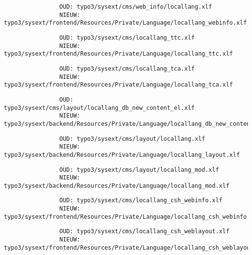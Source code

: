\begin{frame}[fragile]
\begin{itemize}
			\begin{lstlisting}
				OUD: typo3/sysext/cms/web_info/locallang.xlf
				NIEUW: typo3/sysext/frontend/Resources/Private/Language/locallang_webinfo.xlf
			\end{lstlisting}
			\vspace{-0.3cm}
			\begin{lstlisting}
				OUD: typo3/sysext/cms/locallang_ttc.xlf
				NIEUW: typo3/sysext/frontend/Resources/Private/Language/locallang_ttc.xlf
			\end{lstlisting}
			\vspace{-0.3cm}
			\begin{lstlisting}
				OUD: typo3/sysext/cms/locallang_tca.xlf
				NIEUW: typo3/sysext/frontend/Resources/Private/Language/locallang_tca.xlf
			\end{lstlisting}
			\vspace{-0.3cm}
			\begin{lstlisting}
				OUD: typo3/sysext/cms/layout/locallang_db_new_content_el.xlf
				NIEUW: typo3/sysext/backend/Resources/Private/Language/locallang_db_new_content_el.xlf
			\end{lstlisting}
			\vspace{-0.3cm}
			\begin{lstlisting}
				OUD: typo3/sysext/cms/layout/locallang.xlf
				NIEUW: typo3/sysext/backend/Resources/Private/Language/locallang_layout.xlf
			\end{lstlisting}
			\vspace{-0.3cm}
			\begin{lstlisting}
				OUD: typo3/sysext/cms/layout/locallang_mod.xlf
				NIEUW: typo3/sysext/backend/Resources/Private/Language/locallang_mod.xlf
			\end{lstlisting}
			\vspace{-0.3cm}
			\begin{lstlisting}
				OUD: typo3/sysext/cms/locallang_csh_webinfo.xlf
				NIEUW: typo3/sysext/frontend/Resources/Private/Language/locallang_csh_webinfo.xlf
			\end{lstlisting}
			\vspace{-0.3cm}
			\begin{lstlisting}
				OUD: typo3/sysext/cms/locallang_csh_weblayout.xlf
				NIEUW: typo3/sysext/frontend/Resources/Private/Language/locallang_csh_weblayout.xlf
			\end{lstlisting}

	\end{itemize}

\end{frame}

